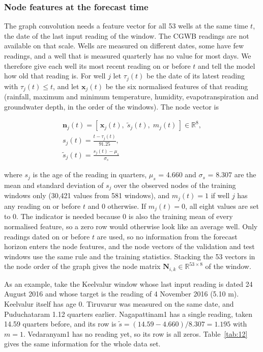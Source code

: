 \documentclass[conference]{IEEEtran}
\begin{document}
\subsubsection{Node features at the forecast time}

The graph convolution needs a feature vector for all 53 wells at the same time \(t\), the date of the last input reading of the window. The CGWB readings are not available on that scale. Wells are measured on different dates, some have few readings, and a well that is measured quarterly has no value for most days. We therefore give each well its most recent reading on or before \(t\) and tell the model how old that reading is. For well \(j\) let \(\tau_j(t)\) be the date of its latest reading with \(\tau_j(t) \le t\), and let \(\mathbf{x}_j(t)\) be the six normalised features of that reading (rainfall, maximum and minimum temperature, humidity, evapotranspiration and groundwater depth, in the order of the windows). The node vector is

\begin{equation}
\begin{gathered}
\mathbf{n}_j(t) = \left[\, \mathbf{x}_j(t),\; \tilde{s}_j(t),\; m_j(t) \,\right] \in \mathbb{R}^{8}, \\
s_j(t) = \frac{t - \tau_j(t)}{91.25}, \\
\tilde{s}_j(t) = \frac{s_j(t) - \mu_s}{\sigma_s}
\end{gathered}\label{eq:16}
\end{equation}

where \(s_j\) is the age of the reading in quarters, \(\mu_s\) = 4.660 and \(\sigma_s\) = 8.307 are the mean and standard deviation of \(s_j\) over the observed nodes of the training windows only (30,421 values from 581 windows), and \(m_j(t) = 1\) if well \(j\) has any reading on or before \(t\) and 0 otherwise. If \(m_j(t) = 0\), all eight values are set to 0. The indicator is needed because 0 is also the training mean of every normalised feature, so a zero row would otherwise look like an average well. Only readings dated on or before \(t\) are used, so no information from the forecast horizon enters the node features, and the node vectors of the validation and test windows use the same rule and the training statistics. Stacking the 53 vectors in the node order of the graph gives the node matrix \(\mathbf{N}_{i,k} \in \mathbb{R}^{53 \times 8}\) of the window.

As an example, take the Keelvalur window whose last input reading is dated 24 August 2016 and whose target is the reading of 4 November 2016 (5.10 m). Keelvalur itself has age 0. Tiruvarur was measured on the same date, and Puduchataram 1.12 quarters earlier. Nagapattinam1 has a single reading, taken 14.59 quarters before, and its row is \(\tilde{s} = (14.59 - 4.660)/8.307 = 1.195\) with \(m = 1\). Vedaranyam1 has no reading yet, so its row is all zeros. Table~\ref{tab:12} gives the same information for the whole data set.
\end{document}
